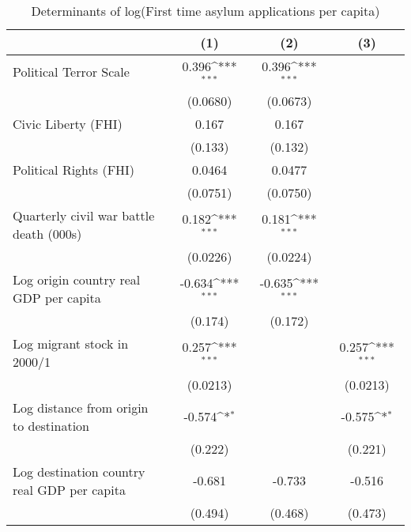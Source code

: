 \begin{table}[htbp]\centering
\def\sym#1{\ifmmode^{#1}\else\(^{#1}\)\fi}
\caption{Determinants of log(First time asylum applications per capita)}
\begin{tabular}{l*{3}{c}}
\hline\hline
                    &\multicolumn{1}{c}{(1)}         &\multicolumn{1}{c}{(2)}         &\multicolumn{1}{c}{(3)}         \\
\hline
Political Terror Scale&       0.396\sym{***}&       0.396\sym{***}&                     \\
                    &    (0.0680)         &    (0.0673)         &                     \\
[1em]
Civic Liberty (FHI) &       0.167         &       0.167         &                     \\
                    &     (0.133)         &     (0.132)         &                     \\
[1em]
Political Rights (FHI)&      0.0464         &      0.0477         &                     \\
                    &    (0.0751)         &    (0.0750)         &                     \\
[1em]
Quarterly civil war battle death (000s)&       0.182\sym{***}&       0.181\sym{***}&                     \\
                    &    (0.0226)         &    (0.0224)         &                     \\
[1em]
Log origin country real GDP per capita&      -0.634\sym{***}&      -0.635\sym{***}&                     \\
                    &     (0.174)         &     (0.172)         &                     \\
[1em]
Log migrant stock in 2000/1&       0.257\sym{***}&                     &       0.257\sym{***}\\
                    &    (0.0213)         &                     &    (0.0213)         \\
[1em]
Log distance from origin to destination&      -0.574\sym{*}  &                     &      -0.575\sym{*}  \\
                    &     (0.222)         &                     &     (0.221)         \\
[1em]
Log destination country real GDP per capita&      -0.681         &      -0.733         &      -0.516         \\
                    &     (0.494)         &     (0.468)         &     (0.473)         \\

\end{tabular}
\end{table}

